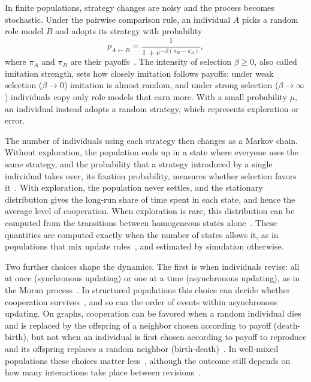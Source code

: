 In finite populations, strategy changes are noisy and the process becomes stochastic. Under the pairwise comparison rule, an individual $A$ picks a random role model $B$ and adopts its strategy with probability
\begin{equation}
p_{A\leftarrow B}=\frac{1}{1+e^{-\beta(\pi_B-\pi_A)}},
\label{eq:pairwise}
\end{equation}
where $\pi_A$ and $\pi_B$ are their payoffs~\cite{Szabo1998, Traulsen2006}. The intensity of selection $\beta\geq 0$, also called imitation strength, sets how closely imitation follows payoffs: under weak selection ($\beta\to 0$) imitation is almost random, and under strong selection ($\beta\to\infty$) individuals copy only role models that earn more. With a small probability $\mu$, an individual instead adopts a random strategy, which represents exploration or error.

The number of individuals using each strategy then changes as a Markov chain. Without exploration, the population ends up in a state where everyone uses the same strategy, and the probability that a strategy introduced by a single individual takes over, its fixation probability, measures whether selection favors it~\cite{Nowak2004}. With exploration, the population never settles, and the stationary distribution gives the long-run share of time spent in each state, and hence the average level of cooperation. When exploration is rare, this distribution can be computed from the transitions between homogeneous states alone~\cite{Fudenberg2006}. These quantities are computed exactly when the number of states allows it, as in populations that mix update rules~\cite{fernandesCounterfactualThinkingStochastic2024}, and estimated by simulation otherwise.

Two further choices shape the dynamics. The first is when individuals revise: all at once (synchronous updating) or one at a time (asynchronous updating), as in the Moran process~\cite{Nowak2004}. In structured populations this choice can decide whether cooperation survives~\cite{Huberman1993}, and so can the order of events within asynchronous updating. On graphs, cooperation can be favored when a random individual dies and is replaced by the offspring of a neighbor chosen according to payoff (death-birth), but not when an individual is first chosen according to payoff to reproduce and its offspring replaces a random neighbor (birth-death)~\cite{Ohtsuki2006}. In well-mixed populations these choices matter less~\cite{Roca2009}, although the outcome still depends on how many interactions take place between revisions~\cite{Roca2006}.


